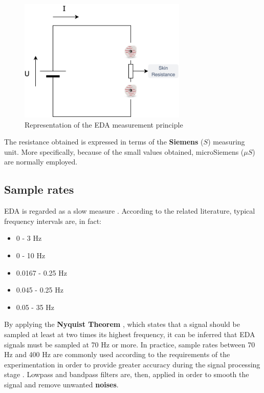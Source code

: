 \begin{figure}[h]
    \centering
    \includegraphics[width=8cm]{./images/skin-resistance.drawio.png}
    \caption{Representation of the EDA measurement principle}
    \label{fig:eda-ans}
\end{figure}

The resistance obtained is expressed in terms of the \textbf{Siemens} ($S$) measuring unit. More specifically, because of the small values obtained, microSiemens ($\mu S$) are normally employed.

\subsection{Sample rates}\label{subsec:eda-signal-properties}

EDA is regarded as a slow measure \cite{eda-guide}. According to the related literature, typical frequency intervals are, in fact:

\begin{itemize}
    \item 0 - 3 Hz \cite{biosignalplux-guide}
    \item 0 - 10 Hz \cite{eda-hci}
    \item 0.0167 - 0.25 Hz \cite{eda-interval-3}
    \item 0.045 - 0.25 Hz \cite{eda-interval-4}
    \item 0.05 - 35 Hz \cite{eda-guide}
\end{itemize}

By applying the \textbf{Nyquist Theorem} \cite{nyquist}, which states that a signal should be sampled at least at two times its highest frequency, it can be inferred that EDA signals must be sampled at 70 Hz or more. In practice, sample rates between 70 Hz and 400 Hz are commonly used according to the requirements of the experimentation in order to provide greater accuracy during the signal processing stage \cite{eda-guide}. Lowpass and bandpass filters are, then, applied in order to smooth the signal and remove unwanted \textbf{noises}.

